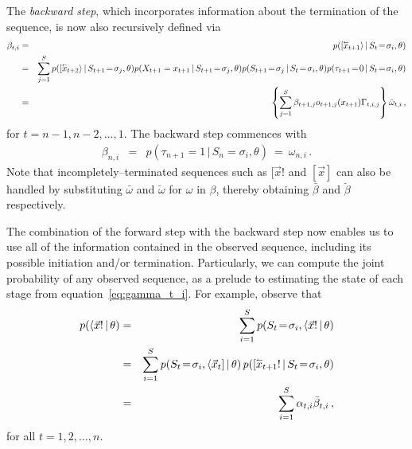 \documentclass[a4paper]{article}
\newcommand{\rvec}[1]{\accentset{\leftarrow}{#1}}
\begin{document}
The {\em backward step}, which incorporates information about the termination of the sequence, is now also recursively defined via
\begin{eqnarray}
   \beta_{t,i} & = & p([\rvec{x}_{t+1}\rangle\,|\,S_t\!=\!\sigma_i,\theta)
\nonumber\\& = & 
   \sum_{j=1}^{S}p([\rvec{x}_{t+2}\rangle\,|\,S_{t+1}\!=\!\sigma_j,\theta)p(X_{t+1}=x_{t+1}\,|\,S_{t+1}\!=\!\sigma_j,\theta)
       p(S_{t+1}\!=\!\sigma_j\,|\,S_t\!=\!\sigma_i,\theta)p(\tau_{t+1}\!=\!0\,|\,S_t\!=\!\sigma_i,\theta)
\nonumber\\& = & 
	\left\{\sum_{j=1}^{S}\beta_{t+1,j}o_{t+1,j}(x_{t+1})\Gamma_{t,i,j}\right\}\bar{\omega}_{t,i}
\,,
\end{eqnarray}
for $t=n-1,n-2,\ldots,1$. The backward step commences with
\begin{eqnarray}
   \beta_{n,i} & = & p(\tau_{n+1}\!=\!1\,|\,S_n\!=\!\sigma_i,\theta)~=~\omega_{n,i}\,.
\end{eqnarray}
Note that incompletely--terminated sequences such as $[\vec{x}!$ and $[\vec{x}]$ can also be handled by substituting $\bar{\omega}$ and $\breve{\omega}$ for $\omega$ in $\beta$, thereby obtaining
$\bar{\beta}$ and $\breve{\beta}$ respectively.

The combination of the forward step with the backward step now enables us to use all of the information contained in the observed sequence, including its possible initiation and/or termination.
Particularly, we can compute the joint probability of any observed sequence, as a prelude to estimating the state of each stage
from equation~\eqref{eq:gamma_t_i}. For example, observe that
\begin{eqnarray}
   p(\langle\vec{x}!\,|\,\theta) 
& = &
	\sum_{i=1}^{S}p(S_t\!=\!\sigma_i,\langle\vec{x}!\,|\,\theta)
\nonumber\\& = &
   \sum_{i=1}^{S}p(S_t\!=\!\sigma_i,\langle\vec{x}_t]\,|\,\theta)\,p([\rvec{x}_{t+1}!\,|\,S_t\!=\!\sigma_i,\theta) 
\nonumber\\& = &
   \sum_{i=1}^{S}\alpha_{t,i}\bar{\beta}_{t,i}\,,
\end{eqnarray}
for all $t=1,2,\ldots,n$.
\end{document}
